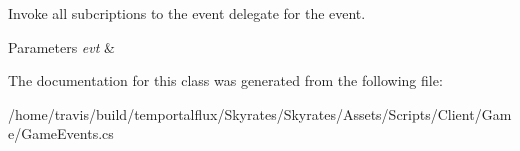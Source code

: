 Invoke all subcriptions to the event delegate for the event. 


\begin{DoxyParams}{Parameters}
{\em evt} & \\
\hline
\end{DoxyParams}


The documentation for this class was generated from the following file\-:\begin{DoxyCompactItemize}
\item 
/home/travis/build/temportalflux/\-Skyrates/\-Skyrates/\-Assets/\-Scripts/\-Client/\-Game/Game\-Events.\-cs\end{DoxyCompactItemize}

